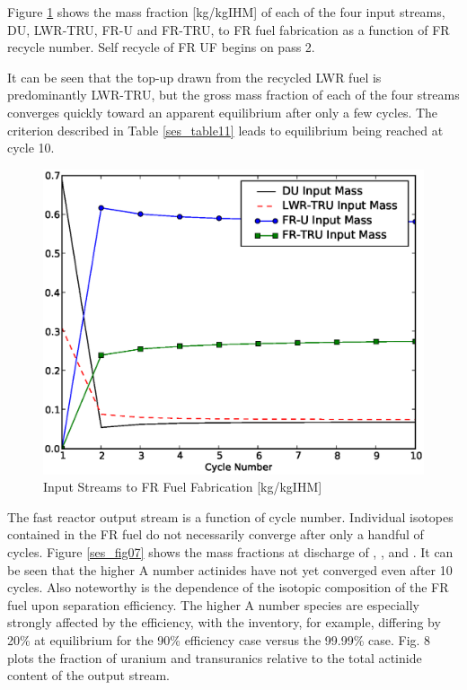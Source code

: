 Figure \ref{ses_fig06} shows the mass fraction [kg/kgIHM] of each of the four
input streams, DU, LWR-TRU, FR-U and FR-TRU, to FR fuel fabrication as a
function of FR recycle number.  Self recycle of FR UF begins on pass 2.

It can be seen that the top-up drawn from the recycled LWR fuel is
predominantly LWR-TRU, but the gross mass fraction of each of the four
streams converges quickly toward an apparent equilibrium after only a
few cycles.  The criterion described in Table \ref{ses_table11} leads to equilibrium
being reached at cycle 10.

\begin{figure}[htbp]
\caption{Input Streams to FR Fuel Fabrication [kg/kgIHM]}
\label{ses_fig06}
\begin{center}
\includegraphics[scale=0.5]{se_sensitivity/figs/MassStreams.eps}
\end{center}
\end{figure}


The fast reactor output stream is a function of cycle number. 
Individual isotopes contained in the FR fuel do not necessarily converge
after only a handful of cycles.  Figure \ref{ses_fig07} shows the mass fractions at
discharge of , ,  and .  
It can be seen that the higher A number actinides have not yet converged even after 10 cycles. 
Also noteworthy is the dependence of the isotopic composition of the FR
fuel upon separation efficiency.  The higher A number species are
especially strongly affected by the efficiency, with the 
inventory, for example, differing by 20\% at equilibrium for the 90\%
efficiency case versus the 99.99\% case.  Fig. 8 plots the fraction of
uranium and transuranics relative to the total actinide content of the
output stream.

